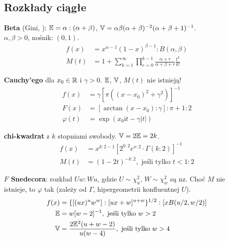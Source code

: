 

\renewcommand{\footrulewidth}{0.4pt}

\begin{multicols*}{2}
\section*{Rozkłady ciągłe}

\begin{enumx}
	\item \textbf{Beta} (Gini, ):
	$\mathbb{E} = \alpha : (\alpha + \beta)$, $\mathbb{V} = \alpha \beta (\alpha + \beta)^{-2} (\alpha + \beta + 1)^{-1}$. \\
	$\alpha, \beta > 0$, nośnik: $(0, 1)$.
	\begin{align*}
		f(x) & = x^{\alpha - 1} (1-x)^{\beta - 1} : B(\alpha, \beta) \\
		M(t) & = 1 + \sum_{k = 1}^\infty \prod_{r = 0}^{k - 1} \frac{\alpha + r}{\alpha + \beta + r} \frac{t^k}{k!}
	\end{align*}
	\item \textbf{Cauchy'ego} dla $x_0 \in \mathbb{R}$ i $\gamma > 0$. $\mathbb{E}$, $\mathbb{V}$, $M(t)$ nie istnieją!
	\begin{align*}
		f(x) & = \gamma [\pi ((x- x_0)^2 + \gamma^2)]^{-1} \\
		F(x) & = [\arctan (x - x_0) : \gamma] : \pi + 1 : 2\\
		\varphi(t) & = \exp (x_0 \textrm{i} t - \gamma |t|)
	\end{align*}
	\item \textbf{chi-kwadrat} z $k$ stopniami swobody.
	$\mathbb{V} = 2 \mathbb{E} = 2k$. %
	\begin{align*}
		f(x) & = x^{k:2 - 1} [2^{k:2} e^{x:2} \cdot \Gamma(k:2)]^{-1}\\
		M(t) & = (1 - 2t)^{-k:2}, \mbox{ jeśli tylko } t < 1:2
	\end{align*}

	\item \textbf{$F$ Snedecora}: rozkład $Uw : Wu$, gdzie $U \sim \chi^2_u$, $W \sim \chi^2_w$ są nz.
	Choć $M$ nie istnieje, to $\varphi$ tak (zależy od $\Gamma$, hipergeometrii konfluentnej $U$).
	\begin{align*}
		f(x) & = \{[(ux)^u w^w] : [ux + w]^{u+w} \}^{1/2} : [x B(u/2, w/2)]\\
		\mathbb{E} & = w [w-2]^{-1}, \mbox{ jeśli tylko } w > 2 \\
		\mathbb{V} & = \frac{2 \mathbb{E}^2 (u+w - 2)}{u(w-4)}, \mbox{ jeśli tylko } w > 4 
	\end{align*}


\end{enumx}
\end{multicols*}
